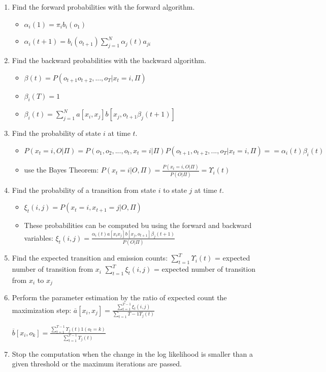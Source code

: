 \begin{enumerate}
\item Find the forward probabilities with the forward algorithm.
\begin{itemize}
\item $\alpha_{i}(1) = \pi_{i} b_{i} (o_{1})$
\item $\alpha_{i}(t + 1) = b_{i}(o_{t+1}) \sum\limits^{N}_{j=1}\alpha_{j}(t)a_{ji}$
\end{itemize}
\item Find the backward probabilities with the backward algorithm.
\begin{itemize}
\item $\beta(t) = P(o_{t+1} o_{t+2},...,o_{T} | x_{t} = i, \Pi) $
\item $\beta_{i}(T) = 1$
\item $\beta_{i}(t) = \sum\limits^{N}_{j=1} a[x_i, x_j] b[x_j,o_{t + 1}\beta_{j}(t + 1)]$
\end{itemize}
\item Find the probability of state $i$ at time $t$.
\begin{itemize}
\item $P (x_t = i, O | \Pi) = P (o_1, o_2,...,o_t, x_t = i | \Pi) P (o_{t + 1}, o_{t + 2},...,o_{T} | x_{t} = i, \Pi) == \alpha_{i}(t) \beta_{i}(t) $
\item use the Bayes Theorem:
$P(x_t = i | O, \Pi) = \frac{P(x_t = i, O | \Pi)}{P(O | \Pi)} = \Upsilon_{i}(t)$
\end{itemize}
\item Find the probability of a transition from state $i$ to state $j$ at time $t$.
\begin{itemize}
\item $\xi_{t}(i,j) = P (x_t = i,x_{t + 1} = j | O, \Pi)$
\item These probabilities can be computed bu using the forward and backward variables:
$\xi_{t}(i,j) = \frac{\alpha_i (t) a[x_i x_j] b[x_j,o_{t + 1}] \beta_j (t + 1)   }{P(O | \Pi)}$
\end{itemize}
\item Find the expected transition and emission counts:
$\sum\limits_{t = 1}^{ T } \Upsilon_i (t)$ = expected number of transition from $x_i$
$\sum\limits_{t = 1}^{ T} \xi_t (i ,j)$ = expected number of transition from $x_i$ to $x_j$
\item Perform the parameter estimation by the ratio of expected count the maximization step:
$\overline{a}[x_i, x_j] = \frac{\sum\limits_{t = 1}^{T - 1}\xi_{t} (i, j)}{\sum\limits_{t = 1} T - 1 \Upsilon_{j}(t)} $

$\overline{b}[x_i, o_k] = \frac{\sum\limits_{t = 1}^{T - 1}\Upsilon_{j} (t) 1 (o_t = k)}{\sum\limits_{t = 1}^{T - 1} \Upsilon_{j}(t)} $
\item Stop the computation when the change in the log likelihood is smaller than a given threshold or the maximum iterations are passed.
\end{enumerate} 



